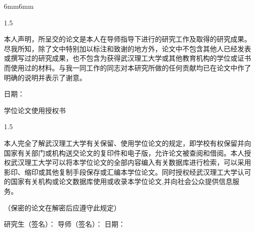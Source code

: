 \begin{titlepage}
\begin{adjustwidth}{6mm}{6mm}

\makebox[30mm]{\vspace{20mm}}

\begin{center}
\end{center}
\vspace{5mm}
\begin{spacing}{1.5}
\par {\STZhongsong  本人声明，所呈交的论文是本人在导师指导下进行的研究工作及取得的研究成果。尽我所知，除了文中特别加以标注和致谢的地方外，论文中不包含其他人已经发表或撰写过的研究成果，也不包含为获得武汉理工大学或其他教育机构的学位或证书而使用过的材料。与我一同工作的同志对本研究所做的任何贡献均已在论文中作了明确的说明并表示了谢意。}
\end{spacing}
\vspace{3mm}
 \CJKunderline{\makebox[30mm]{}} \hspace{8mm} {\STZhongsong 日\hspace{3mm}期：} \CJKunderline{\makebox[30mm]{}}


\vspace{40mm}


\begin{center}
\heiti 学位论文使用授权书
\end{center}
\vspace{3mm}
\begin{spacing}{1.5}
\par {\STZhongsong 本人完全了解武汉理工大学有关保留、使用学位论文的规定，即学校有权保留并向国家有关部门或机构送交论文的复印件和电子版，允许论文被查阅和借阅。本人授权武汉理工大学可以将本学位论文的全部内容编入有关数据库进行检索，可以采用影印、缩印或其他复制手段保存或汇编本学位论文。同时授权经武汉理工大学认可的国家有关机构或论文数据库使用或收录本学位论文,并向社会公众提供信息服务。}
\end{spacing}
\vspace{3mm}
\par {\STZhongsong（保密的论文在解密后应遵守此规定）}

\vspace{20mm}
\par {\STZhongsong 研究生（签名）：} \hspace{20mm} {\STZhongsong 导师（签名）：} \hspace{20mm} {\STZhongsong 日期：}

\end{adjustwidth}
\end{titlepage}


